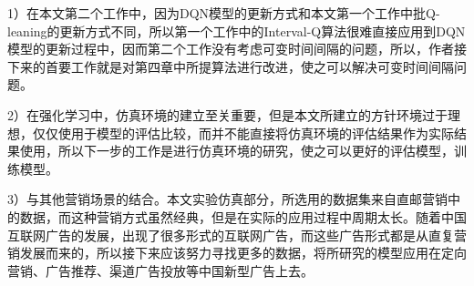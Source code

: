  1）在本文第二个工作中，因为DQN模型的更新方式和本文第一个工作中批Q-leaning的更新方式不同，所以第一个工作中的Interval-Q算法很难直接应用到DQN模型的更新过程中，因而第二个工作没有考虑可变时间间隔的问题，所以，作者接下来的首要工作就是对第四章中所提算法进行改进，使之可以解决可变时间间隔问题。

 2）在强化学习中，仿真环境的建立至关重要，但是本文所建立的方针环境过于理想，仅仅使用于模型的评估比较，而并不能直接将仿真环境的评估结果作为实际结果使用，所以下一步的工作是进行仿真环境的研究，使之可以更好的评估模型，训练模型。

 3）与其他营销场景的结合。本文实验仿真部分，所选用的数据集来自直邮营销中的数据，而这种营销方式虽然经典，但是在实际的应用过程中周期太长。随着中国互联网广告的发展，出现了很多形式的互联网广告，而这些广告形式都是从直复营销发展而来的，所以接下来应该努力寻找更多的数据，将所研究的模型应用在定向营销、广告推荐、渠道广告投放等中国新型广告上去。